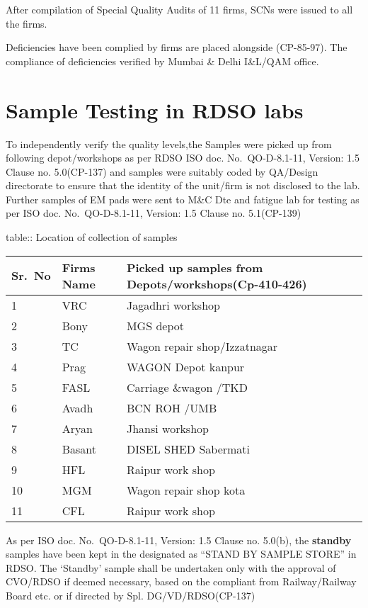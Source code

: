\documentclass[nofonts,]{tufte-book}
\begin{document}
After compilation of Special Quality Audits of 11 firms, SCNs were
issued to all the firms.

Deficiencies have been complied by firms are placed alongside
(CP-85-97). The compliance of deficiencies verified by Mumbai \& Delhi
I\&L/QAM office.

\hypertarget{sample-testing-in-rdso-labs}{%
\section{Sample Testing in RDSO
labs}\label{sample-testing-in-rdso-labs}}

To independently verify the quality levels,the Samples were picked up
from following depot/workshops as per RDSO ISO doc. No.~QO-D-8.1-11,
Version: 1.5 Clause no. 5.0(CP-137) and samples were suitably coded by
QA/Design directorate to ensure that the identity of the unit/firm is
not disclosed to the lab. Further samples of EM pads were sent to M\&C
Dte and fatigue lab for testing as per ISO doc. No.~QO-D-8.1-11,
Version: 1.5 Clause no. 5.1(CP-139)

table:: Location of collection of samples

\begin{longtable}[]{@{}lll@{}}
\toprule
Sr.~No & Firms Name & Picked up samples from
Depots/workshops(Cp-410-426) \\
\midrule
\endhead
1 & VRC & Jagadhri workshop \\
2 & Bony & MGS depot \\
3 & TC & Wagon repair shop/Izzatnagar \\
4 & Prag & WAGON Depot kanpur \\
5 & FASL & Carriage \&wagon /TKD \\
6 & Avadh & BCN ROH /UMB \\
7 & Aryan & Jhansi workshop \\
8 & Basant & DISEL SHED Sabermati \\
9 & HFL & Raipur work shop \\
10 & MGM & Wagon repair shop kota \\
11 & CFL & Raipur work shop \\
\bottomrule
\end{longtable}

As per ISO doc. No.~QO-D-8.1-11, Version: 1.5 Clause no. 5.0(b), the
\textbf{standby} samples have been kept in the designated as ``STAND BY
SAMPLE STORE'' in RDSO. The `Standby' sample shall be undertaken only
with the approval of CVO/RDSO if deemed necessary, based on the
compliant from Railway/Railway Board etc. or if directed by Spl.
DG/VD/RDSO(CP-137)
\end{document}
